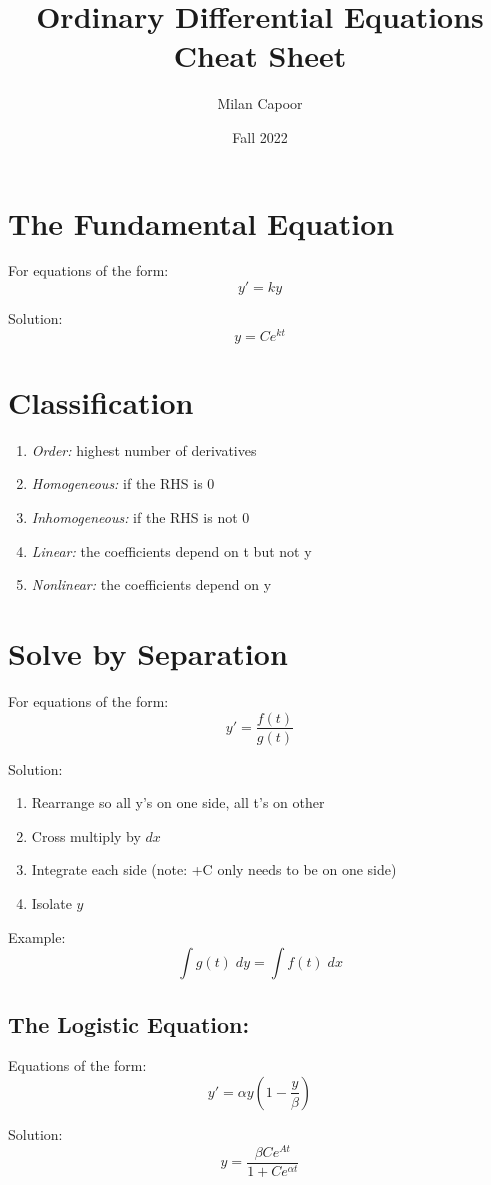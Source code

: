 \documentclass[12pt]{article}
\title{Ordinary Differential Equations Cheat Sheet}
\author{Milan Capoor}
\date{Fall 2022}
\begin{document}
\maketitle

\section{The Fundamental Equation}
For equations of the form:
\[y' = k y\] 

Solution:
\[\boxed{y = Ce^{k t}}\]

\section{Classification}
\begin{enumerate}
    \item \emph{Order:} highest number of derivatives
    \item \emph{Homogeneous:} if the RHS is 0
    \item \emph{Inhomogeneous:} if the RHS is not 0
    \item \emph{Linear:} the coefficients depend on t but not y
    \item \emph{Nonlinear:} the coefficients depend on y
\end{enumerate}

\section{Solve by Separation}
For equations of the form:
\[y' = \frac{f(t)}{g(t)}\]

Solution:
\begin{enumerate}
    \item Rearrange so all y's on one side, all t's on other
    \item Cross multiply by $dx$
    \item Integrate each side (note: +C only needs to be on one side)
    \item Isolate $y$
\end{enumerate}

Example:
\[\int g(t) \; dy = \int f(t) \; dx \]

\subsection*{The Logistic Equation:}
Equations of the form:
\[y' = \alpha y (1 - \frac{y}{\beta})\]

Solution:
\[\boxed{y = \frac{\beta Ce^{At}}{1 + Ce^{\alpha t}}}\]
\end{document}
